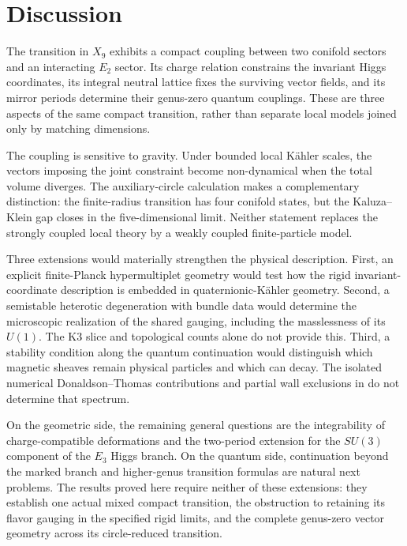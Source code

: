 \section{Discussion}
\label{sec:discussion}

The transition in $X_9$ exhibits a compact coupling between
two conifold sectors and an interacting $E_2$ sector. Its
charge relation constrains the invariant Higgs coordinates,
its integral neutral lattice fixes the surviving vector
fields, and its mirror periods determine their genus-zero
quantum couplings. These are three aspects of the same
compact transition, rather than separate local models joined
only by matching dimensions.

The coupling is sensitive to gravity. Under bounded local
K\"ahler scales, the vectors imposing the joint constraint
become non-dynamical when the total volume diverges. The
auxiliary-circle calculation makes a complementary distinction:
the finite-radius transition has four conifold states, but
the Kaluza--Klein gap closes in the five-dimensional limit.
Neither statement replaces the strongly coupled local theory
by a weakly coupled finite-particle model.

Three extensions would materially strengthen the physical
description. First, an explicit finite-Planck hypermultiplet
geometry would test how the rigid invariant-coordinate
description is embedded in quaternionic-K\"ahler geometry.
Second, a semistable heterotic degeneration with bundle data
would determine the microscopic realization of the shared
gauging, including the masslessness of its $U(1)$. The K3
slice and topological counts alone do not provide this.
Third, a stability condition along the quantum continuation
would distinguish which magnetic sheaves remain physical
particles and which can decay. The isolated numerical
Donaldson--Thomas contributions and partial wall exclusions
in \cite{Wuebben:2026magnetic} do not determine that spectrum.

On the geometric side, the remaining general questions are
the integrability of charge-compatible deformations and the
two-period extension for the $SU(3)$ component of the $E_3$
Higgs branch. On the quantum side, continuation beyond the
marked branch and higher-genus transition formulas are natural
next problems. The results proved here require neither of
these extensions: they establish one actual mixed compact
transition, the obstruction to retaining its flavor gauging
in the specified rigid limits, and the complete genus-zero
vector geometry across its circle-reduced transition.
